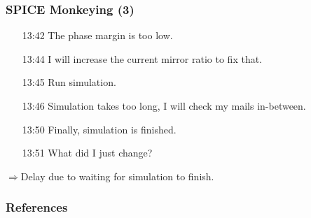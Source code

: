 \documentclass[10pt, aspectratio=169]{beamer}
\begin{document}
\begin{frame}
\frametitle{SPICE Monkeying (3)}
\begin{itemize}
  \item[13:42] The phase margin is too low.
  \item[13:44] I will increase the current mirror ratio to fix that.
  \item[13:45] Run simulation.
  \item[13:46] Simulation takes too long, I will check my mails in-between.
  \item[13:50] Finally, simulation is finished.
  \item[13:51] What did I just change?
\end{itemize}
\vspace{5mm}
$\Rightarrow$Delay due to waiting for simulation to finish.
\end{frame}


\begin{frame}[allowframebreaks]
\frametitle{References}
\printbibliography
\end{frame}
\end{document}
